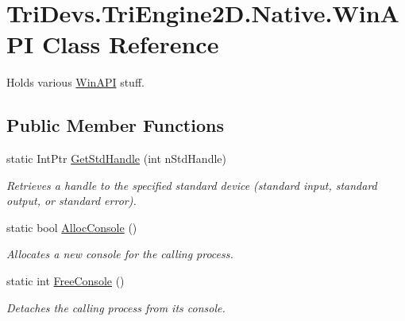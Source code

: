 \hypertarget{class_tri_devs_1_1_tri_engine2_d_1_1_native_1_1_win_a_p_i}{\section{Tri\-Devs.\-Tri\-Engine2\-D.\-Native.\-Win\-A\-P\-I Class Reference}
\label{class_tri_devs_1_1_tri_engine2_d_1_1_native_1_1_win_a_p_i}
}


Holds various \hyperlink{class_tri_devs_1_1_tri_engine2_d_1_1_native_1_1_win_a_p_i}{Win\-A\-P\-I} stuff.  


\subsection*{Public Member Functions}
\begin{DoxyCompactItemize}
\item 
static Int\-Ptr \hyperlink{class_tri_devs_1_1_tri_engine2_d_1_1_native_1_1_win_a_p_i_a7617bf77270291625f566cf21294d518}{Get\-Std\-Handle} (int n\-Std\-Handle)
\begin{DoxyCompactList}\small\item\em Retrieves a handle to the specified standard device (standard input, standard output, or standard error). \end{DoxyCompactList}\item 
static bool \hyperlink{class_tri_devs_1_1_tri_engine2_d_1_1_native_1_1_win_a_p_i_a00f0889a729e989fbefd8267a20a1c06}{Alloc\-Console} ()
\begin{DoxyCompactList}\small\item\em Allocates a new console for the calling process. \end{DoxyCompactList}\item 
static int \hyperlink{class_tri_devs_1_1_tri_engine2_d_1_1_native_1_1_win_a_p_i_a14d148cdaa742fd0d25fd962f6c1f8c4}{Free\-Console} ()
\begin{DoxyCompactList}\small\item\em Detaches the calling process from its console. \end{DoxyCompactList}\end{DoxyCompactItemize}
